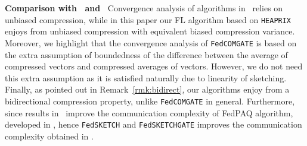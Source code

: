 \documentclass[sigconf, anonymous, review]{acmart}
\begin{document}
\noindent\textbf{Comparison  with~\citep{haddadpour2020federated} and~\citep{reisizadeh2020fedpaq}}
Convergence analysis of algorithms in~\cite{haddadpour2020federated} relies on unbiased compression, while in this paper our FL algorithm based on \texttt{HEAPRIX} enjoys from unbiased compression with equivalent biased compression variance. Moreover, we highlight that the convergence analysis of \texttt{FedCOMGATE} is based on the extra assumption of boundedness of the difference between the average of compressed vectors and compressed averages of vectors. 
However, we do not need this extra assumption as it is satisfied naturally due to linearity of sketching. 
Finally, as pointed out in Remark~\ref{rmk:bidirect}, our algorithms enjoy from a bidirectional compression property, unlike \texttt{FedCOMGATE} in general. 
Furthermore, since results in~\cite{haddadpour2020federated} improve the communication complexity of FedPAQ algorithm, developed in \cite{reisizadeh2020fedpaq}, hence \texttt{FedSKETCH} and \texttt{FedSKETCHGATE} improves the communication complexity obtained in \cite{reisizadeh2020fedpaq}. 
\end{document}
